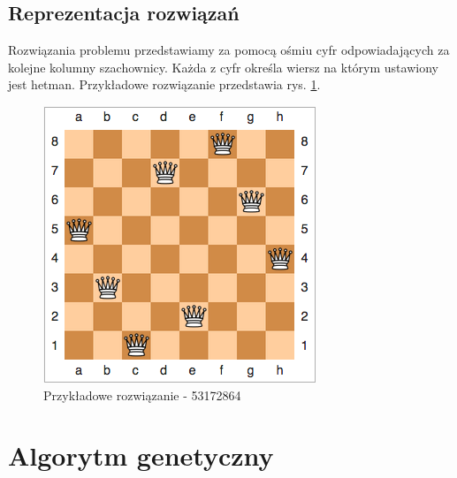 \documentclass[12pt, twoside]{article}
\begin{document}
\subsection{Reprezentacja rozwiązań}
Rozwiązania problemu przedstawiamy za pomocą ośmiu cyfr odpowiadających za kolejne kolumny szachownicy. Każda z cyfr określa wiersz na którym ustawiony jest hetman. Przykładowe rozwiązanie przedstawia rys. \ref{fig:example}.

\begin{figure}[H]
	\centering
	\includegraphics[keepaspectratio=true, scale=0.7]{example-53172864.png}
	\caption{Przykładowe rozwiązanie - 53172864}
	\label{fig:example}
\end{figure}

\clearpage
\section{Algorytm genetyczny}
\end{document}
